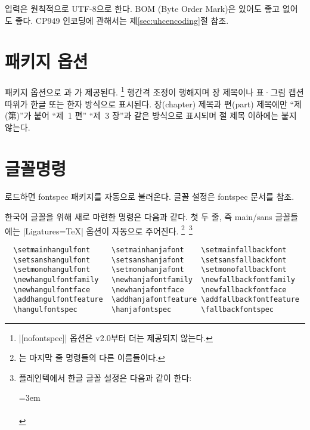 \documentclass[a4paper]{article}
\def\luatex{\hologo{LuaTeX}}
\def\logoko{\textsf{k}\kern-.0625em\textit{o}}
\def\luatexko{\luatex-\logoko}
\begin{document}
입력은 원칙적으로 UTF-8으로 한다.
BOM (Byte Order Mark)은 있어도 좋고 없어도 좋다.
CP949 인코딩에 관해서는 제\ref{sec:uhcencoding}절 참조.

\section{패키지 옵션}\label{sec:packageopt}

패키지 옵션으로 과 가 제공된다.%
\footnote{%
  |[nofontspec]| 옵션은 v2.0부터 더는 제공되지 않는다. }
행간격 조정이 행해지며
장 제목이나 표·그림 캡션 따위가 한글 또는 한자 방식으로 표시된다.
장(chapter) 제목과 편(part) 제목에만 ``제(第)''가 붙어 ``제~1 편''
``제~3 장''과 같은 방식으로 표시되며 절 제목 이하에는 붙지 않는다.

\section{글꼴명령}\label{sec:fontcmds}

 로드하면 fontspec 패키지를 자동으로 불러온다. 글꼴 설정은
fontspec 문서를 참조.

한국어 글꼴을 위해 새로 마련한 명령은 다음과 같다.
첫 두 줄, 즉 main/sans 글꼴들에는 |Ligatures=TeX| 옵션이 자동으로 주어진다.%
\footnote{%
    는
  마지막 줄 명령들의 다른 이름들이다. }\,%
\footnote{%
  플레인텍에서 한글 글꼴 설정은 다음과 같이 한다:\par
  \leftskip=3em\noindent
  \\
  \\
   }
\pkgkwd*{\setmainhangulfont}%
\pkgkwd*{\setsanshangulfont}%
\pkgkwd*{\setmonohangulfont}%
\pkgkwd*{\newhangulfontfamily}%
\pkgkwd*{\newhangulfontface}%
\pkgkwd*{\addhangulfontfeature}%
\pkgkwd*{\hangulfontspec}%
\begin{verbatim}
  \setmainhangulfont     \setmainhanjafont    \setmainfallbackfont
  \setsanshangulfont     \setsanshanjafont    \setsansfallbackfont
  \setmonohangulfont     \setmonohanjafont    \setmonofallbackfont
  \newhangulfontfamily   \newhanjafontfamily  \newfallbackfontfamily
  \newhangulfontface     \newhanjafontface    \newfallbackfontface
  \addhangulfontfeature  \addhanjafontfeature \addfallbackfontfeature
  \hangulfontspec        \hanjafontspec       \fallbackfontspec
\end{verbatim}
\end{document}
